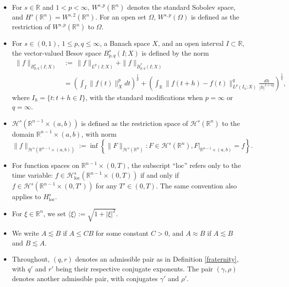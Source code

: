 \documentclass[preprint,compress,12pt]{elsarticle}
\numberwithin{equation}{section}
\begin{document}
\begin{itemize}[label={\textbf{--}}]
	\item For $s\in\mathbb{R}$ and  $1<p<\infty$,  \( W^{s,p}(\mathbb{R}^{n})\) denotes the standard Sobolev space, and $H^{s}(\mathbb{R}^{n})=W^{s,2}(\mathbb{R}^{n})$. For an open set  $\Omega$, $W^{s,p}(\Omega)$ is defined as the restriction of \( W^{s,p}(\mathbb{R}^{n})\) to $\Omega$.
\item For $s\in (0,1)$, $1\leq p,q \leq \infty$, a Banach space $X$, and an open interval $I\subset\mathbb{R}$, the vector-valued Besov space $B^{s}_{p,q}(I;X)$ is defined by the norm
\begin{equation}\label{denounce}
	\begin{aligned} \|f\|_{B^{s}_{p,q}(I;X)}&:=\,\|f\|_{L^{p}(I;X)}+\|f\|_{\dot{B}^{s}_{p,q}(I;X)}\\			&=\left(\int_{I}\|f(t)\|_{X}^{p}dt\right)^{\frac{1}{p}}+\left(\int_{\mathbb{R}} \|f(t+h)-f(t)\|_{L^{p}(I_{h};X)}^{q} \frac{dh}{|h|^{1+sq}}\right)^{\frac{1}{q}},
	\end{aligned}
\end{equation}
where $I_{h}=\{t: t+h\in I \}$, with the standard modifications when $p=\infty$ or $q=\infty$.
	\item $\mathcal{H}^{s}(\mathbb{R}^{n-1}\times (a,b))$ is  defined as the restriction space of $\mathcal{H}^{s}(\mathbb{R}^{n})$   to the domain $\mathbb{R}^{n-1}\times(a,b)$, with norm
\begin{equation}
	\|f\|_{\mathcal{H}^{s}(\mathbb{R}^{n-1}\times (a,b))}:=\inf\left\{\|F\|_{\mathcal{H}^{s}(\mathbb{R}^{n})}: F\in\mathcal{H}^{s}(\mathbb{R}^{n}), F|_{\mathbb{R}^{n-1}\times (a,b)}=f\right\}.
\end{equation}
	\item For function spaces on $\mathbb{R}^{n-1}\times(0,T)$, the subscript ``$\mathrm{loc}$'' refers only to the time variable:  $f\in\mathcal{H}_{\mathrm{loc}}^{s}(\mathbb{R}^{n-1}\times(0,T))$ if and only if $f\in \mathcal{H}^{s}(\mathbb{R}^{n-1}\times(0,T'))$ for any $T'\in (0,T)$. The same convention also applies to $H_{\mathrm{loc}}^{s}$.
	\item For $\xi\in\mathbb{R}^{n}$, we set $\langle\xi\rangle:=\sqrt{1+|\xi|^{2}}$.
	\item We write $A\lesssim B$ if $A\leq CB$ for some constant $C>0$, and $A\approx B$ if $A\lesssim B$ and $B\lesssim A$.
	\item
     Throughout, $(q,r)$ denotes an admissible pair as in Definition \ref{fraternity}, with $q'$ and $r'$ being their respective conjugate exponents. The pair $(\gamma, \rho)$ denotes another admissible pair, with conjugates $\gamma'$ and $\rho'$.
\end{itemize}
\end{document}
